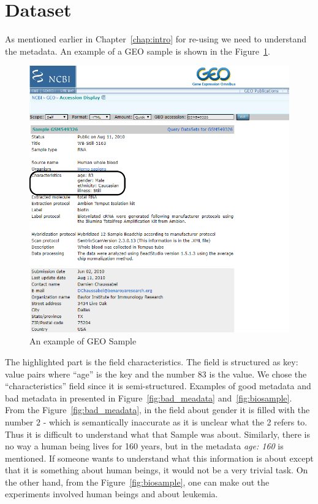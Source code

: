 


\section{Dataset}\label{section:data}
As mentioned earlier in Chapter~\ref{chap:intro} for re-using we need to understand the metadata. 
An example of a GEO sample is shown in the Figure~\ref{figure: sample}. 
\begin{figure}[h!]
\centering
\includegraphics[scale=0.5]{Figures/sample.png}
\caption{An example of GEO Sample}
\label{figure: sample}
\end{figure}
The highlighted part is the field characteristics. The field is structured as key: value pairs where ``age'' is the key and the number $83$ is the value. We chose the ``characteristics'' field since it is semi-structured.
Examples of good metadata and bad metadata in presented in Figure~\ref{fig:bad_meadata} and~\ref{fig:biosample}. From the Figure~\ref{fig:bad_meadata}, in the field about gender it is filled with the number $2$ - which is semantically inaccurate as it is unclear what the 2 refers to. Thus it is difficult to understand what that Sample was about. Similarly, there is no way a human being lives for 160 years, but in the metadata \emph{age: 160} is mentioned. If someone wants to understand what this information is about except that it is something about human beings, it would not be a very trivial task. On the other hand, from the Figure~\ref{fig:biosample}, one can make out the experiments involved human beings and about leukemia.

